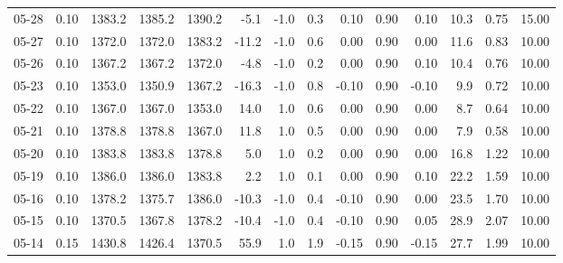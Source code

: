 \begin{threeparttable}
{\begin{tabular}{lrrrrrrrrrrrrr}
  05-28 &     0.10 & 1383.2 & 1385.2 & 1390.2 &       -5.1 &                     -1.0 &                 0.3 &       0.10 &      0.90 &           0.10 &             10.3 &            0.75 &                  15.00 \\
  05-27 &     0.10 & 1372.0 & 1372.0 & 1383.2 &      -11.2 &                     -1.0 &                 0.6 &       0.00 &      0.90 &           0.00 &             11.6 &            0.83 &                  10.00 \\
  05-26 &     0.10 & 1367.2 & 1367.2 & 1372.0 &       -4.8 &                     -1.0 &                 0.2 &       0.00 &      0.90 &           0.10 &             10.4 &            0.76 &                  10.00 \\
  05-23 &     0.10 & 1353.0 & 1350.9 & 1367.2 &      -16.3 &                     -1.0 &                 0.8 &      -0.10 &      0.90 &          -0.10 &              9.9 &            0.72 &                  10.00 \\
  05-22 &     0.10 & 1367.0 & 1367.0 & 1353.0 &       14.0 &                      1.0 &                 0.6 &       0.00 &      0.90 &           0.00 &              8.7 &            0.64 &                  10.00 \\
  05-21 &     0.10 & 1378.8 & 1378.8 & 1367.0 &       11.8 &                      1.0 &                 0.5 &       0.00 &      0.90 &           0.00 &              7.9 &            0.58 &                  10.00 \\
  05-20 &     0.10 & 1383.8 & 1383.8 & 1378.8 &        5.0 &                      1.0 &                 0.2 &       0.00 &      0.90 &           0.00 &             16.8 &            1.22 &                  10.00 \\
  05-19 &     0.10 & 1386.0 & 1386.0 & 1383.8 &        2.2 &                      1.0 &                 0.1 &       0.00 &      0.90 &           0.10 &             22.2 &            1.59 &                  10.00 \\
  05-16 &     0.10 & 1378.2 & 1375.7 & 1386.0 &      -10.3 &                     -1.0 &                 0.4 &      -0.10 &      0.90 &           0.00 &             23.5 &            1.70 &                  10.00 \\
  05-15 &     0.10 & 1370.5 & 1367.8 & 1378.2 &      -10.4 &                     -1.0 &                 0.4 &      -0.10 &      0.90 &           0.05 &             28.9 &            2.07 &                  10.00 \\
  05-14 &     0.15 & 1430.8 & 1426.4 & 1370.5 &       55.9 &                      1.0 &                 1.9 &      -0.15 &      0.90 &          -0.15 &             27.7 &            1.99 &                  10.00 \\

\end{tabular}}
\end{threeparttable}
